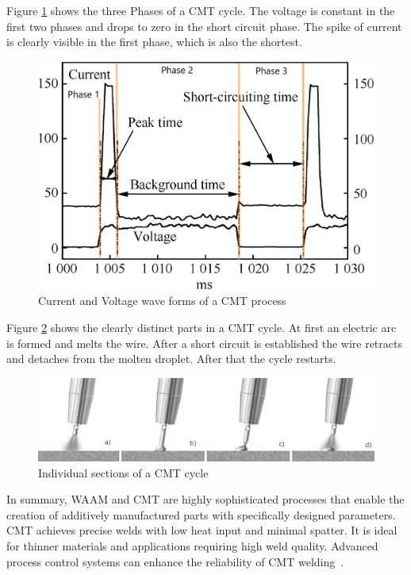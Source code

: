 Figure \ref{fig:CMT} shows the three Phases of a \acrshort{CMT} cycle. The voltage is constant in the first two phases and drops to zero in the short circuit phase. The spike of current is clearly visible in the first phase, which is also the shortest.

\begin{figure}[H]
	\centering
	\includegraphics[width=0.7\linewidth]{figures/CMT.jpg}
	\caption{Current and Voltage wave forms of a CMT process~\cite{Selvi.2018img}}
	\label{fig:CMT}
\end{figure}

\newpage
Figure \ref{fig:CMT2} shows the clearly distinct parts in a \acrshort{CMT} cycle. At first an electric arc is formed and melts the wire. After a short circuit is established the wire retracts and detaches from the molten droplet. After that the cycle restarts.

\begin{figure}[H]
	\centering
	\includegraphics[width=0.9\linewidth]{figures/CMT2.png}
	\caption{Individual sections of a CMT cycle~\cite{Dalton.28102023}}
	\label{fig:CMT2}
\end{figure}


In summary, \acrshort{WAAM} and \acrshort{CMT} are highly sophisticated processes that enable the creation of additively manufactured parts with specifically designed parameters. \acrshort{CMT} achieves precise welds with low heat input and minimal spatter. It is ideal for thinner materials and applications requiring high weld quality. Advanced process control systems can enhance the reliability of \acrshort{CMT} welding~\cite{Rahul.2018, Pickin.2011}.


